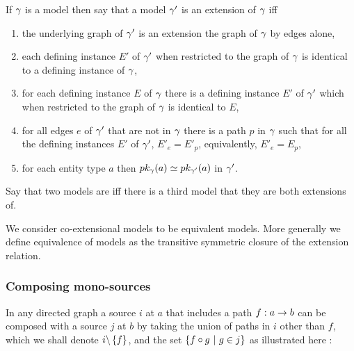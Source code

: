 \begin{definition}
If $\genericmodel$ is a model then say that a model $\genericmodel'$ is an extension of 
$\genericmodel$ iff 
\begin{enumerate}
\item the underlying graph of $\genericmodel'$ is an extension the graph of $\genericmodel$
by edges alone, 
\item each defining instance $E'$ of $\genericmodel'$ when restricted to the graph of $\genericmodel$
is identical to a defining instance of $\genericmodel$,
\item for each defining instance $E$ of $\genericmodel$ there is a defining instance $E'$ of $\genericmodel'$ which when restricted to the graph of $\genericmodel$
is identical to $E$,
\item for all edges $e$ of $\genericmodel'$ that are not in $\genericmodel$ there is a path 
$p$ in $\genericmodel$ such that for all the defining instances $E'$ of $\genericmodel'$,
$E'_e=E'_p$, equivalently, $E'_e=E_p$,
\item for each entity type $a$  then $\pk[\genericmodel]{a} \simeq \pk[\genericmodel']{a}$ in $\genericmodel'$. 
\end{enumerate}
\end{definition}

\begin{definition}
Say that two models are   iff there is a third model that they are both extensions of.
\end{definition}
We consider co-extensional models to be equivalent models. More generally we define equivalence 
of models as the transitive symmetric closure of the extension relation.  

\subsubsection{Composing mono-sources}

In any directed graph a source $i$ at $a$ that includes a path $f:a \morph b$ can be composed with a source $j$ at $b$ by taking the union of paths in $i$ other than $f$, which we shall denote $i\backslash \set{f}$, and the set $\setsuchthat{f \circ g}{g \in j}$ as illustrated here :

